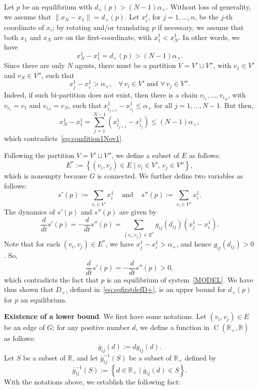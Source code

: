 \documentclass[10pt,twocolumn,twoside]{IEEEtran}
\newcommand{\R}{\mathbb{R}}
\newcommand{\ol}{\overline}
\renewcommand{\(}{\left (}
\renewcommand{\)}{\right )}
\renewcommand{\;}{\,;\,}
\begin{document}
Let $p$ be an equilibrium with $d_+(p) > (N - 1)\alpha_+$. Without loss of generality, we assume that $\|x_N - x_1\| = d_+(p)$.  Let $x^j_i$, for $j =1,\ldots, n$,  be the $j$-th coordinate of $x_i$; by rotating and/or translating $p$ if necessary, we assume that both $x_1$ and $x_N$ are on the first-coordinate, with $x^1_1 < x^1_N$. In other words, we have 
\begin{equation}\label{eq:condition1Nov1}
x^1_N - x^1_1 = d_+(p) > (N - 1) \alpha_+ .
\end{equation}
Since there are only $N$ agents,  there must be a partition 
$
V = V' \sqcup V''
$, with $v_1\in V'$ and  $v_N\in V''$, such that 
$$
x^1_{j} - x^1_{i}   > \alpha_+, \hspace{10pt} \forall \, v_i\in V' \mbox{ and } \forall\, v_j\in V''.
$$  
Indeed, if such bi-partition does not exist, then there is a chain $v_{i_1}, \ldots,v_{i_N}$, with $v_{i_1} = v_1$ and $v_{i_N} = v_N$, such that 
$
x^1_{i_{j+1}} - x^1_{i_j} \le \alpha_+
$   for all  $j = 1,\ldots, N-1$. 
But then, 
$$
x^1_N - x^1_1 = \sum^{N-1}_{j=1} \(x^1_{i_{j+1}} - x^1_{i_{j}} \)  \le (N - 1) \alpha_+,
$$
which contradicts~\eqref{eq:condition1Nov1}.  

Following the partition $V = V' \sqcup V''$, we define a subset of $E$ as follows:
$$
E^*:= \left\{  (v_i, v_j) \in E \mid v_i\in V',\, v_j\in V'' \right \},
$$
which is nonempty because $G$ is connected. We further define two variables as follows: 
$$
s'(p):= \sum_{v_i \in V'} x^1_i \hspace{10pt} \mbox{ and } \hspace{10pt} s''(p):= \sum_{v_i \in V''} x^1_i. 
$$  
The dynamics of $s'(p)$ and $s''(p)$ are given by
$$
\frac{d}{dt} s'(p) = -\frac{d}{dt} s''(p)  = \sum_{(v_i,v_j) \in E^*} g_{ij}(d_{ij}) (x^1_j - x^1_i ). 
$$
Note that for each $(v_i,v_j)\in E^*$, we have  
$
x^1_j - x^1_i > \alpha_+ 
$, and hence $g_{ij}(d_{ij}) > 0$. So,   
$$
\frac{d}{dt} s'(p) = -\frac{d}{dt} s''(p) > 0,
$$
which contradicts the fact that $p$ is an equilibrium of system~\eqref{MODEL}. We have thus shown that $D_+$, defined in~\eqref{eq:eqfirstdefD+}, is  an upper bound for $d_+(p)$ for $p$ an equilibrium. 

 
\vspace{3pt}
\noindent
{\bf Existence of a lower bound}.  We first have some notations. Let $(v_i,v_j)\in E$ be an edge of $G$; for any positive number $d$,  we define a function in $\operatorname{C}(\R_+, \R)$ as follows:
\begin{equation}\label{eq:defbargij}
\ol g_{ij}(d) := dg_{ij}(d).
\end{equation}
Let  $S$ be a subset of $\R$, and let $\ol g^{-1}_{ij}(S)$ be a subset of $\R_+$ defined by 
$$
\ol g_{ij}^{-1}(S) := \left\{ d \in \R_+ \mid \ol g_{ij}(d) \in S  \right\}.
$$
With the notations above, we establish the following fact:
\end{document}
